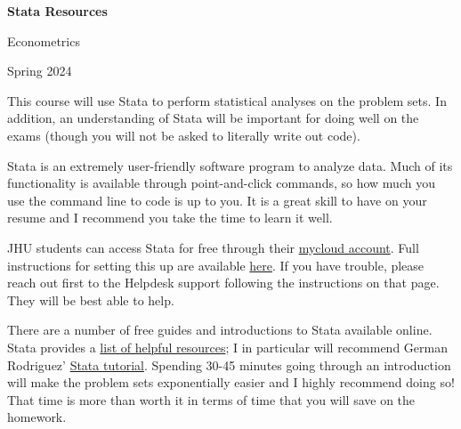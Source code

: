 \documentclass{article}
\begin{document}
\begin{center}
    \Large
    \textbf{Stata Resources}
    \normalsize

    \vspace{1mm}

    Econometrics

    \vspace{1mm}

    Spring 2024
\end{center}
\medskip

This course will use Stata to perform statistical analyses on the problem sets. In addition, an understanding of Stata will be important for doing well on the exams (though you will not be asked to literally write out code).

\vspace{2mm}

Stata is an extremely user-friendly software program to analyze data. Much of its functionality is available through point-and-click commands, so how much you use the command line to code is up to you. It is a great skill to have on your resume and I recommend you take the time to learn it well.

\vspace{2mm}

JHU students can access Stata for free through their \href{http://mycloud.jh.edu/}{mycloud account}. Full instructions for setting this up are available \href{https://studentaffairs.jhu.edu/computing/campus-resources/myjlab/}{here}. If you have trouble, please reach out first to the Helpdesk support following the instructions on that page. They will be best able to help.

\vspace{2mm}

There are a number of free guides and introductions to Stata available online. Stata provides a \href{https://www.stata.com/links/resources-for-learning-stata/}{list of helpful resources}; I in particular will recommend German Rodriguez' \href{https://grodri.github.io/stata/}{Stata tutorial}. Spending 30-45 minutes going through an introduction will make the problem sets exponentially easier and I highly recommend doing so! That time is more than worth it in terms of time that you will save on the homework.
\end{document}
